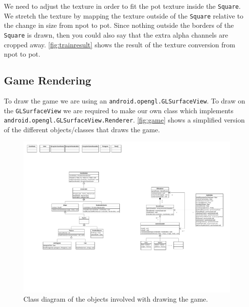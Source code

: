 We need to adjust the texture in order to fit the \ac{pot} texture inside the \lstinline|Square|. We stretch the texture by mapping the texture outside of the \lstinline|Square| relative to the change in size from \ac{npot} to \ac{pot}. Since nothing outside the borders of the \lstinline|Square| is drawn, then you could also say that the extra alpha channels are cropped away. \autoref{fig:trainresult} shows the result of the texture conversion from \ac{npot} to \ac{pot}.

\subsection{Game Rendering}\label{sec:gamerendering}

To draw the game we are using an \lstinline|android.opengl.GLSurfaceView|. To draw on the \lstinline|GLSurfaceView| we are required to make our own class which implements \lstinline|android.opengl.GLSurfaceView.Renderer|. \autoref{fig:game} shows a simplified version of the different objects/classes that draws the game.

\begin{figure}[H]
\centering
\includegraphics[page=3,width=1\linewidth]{img/opengl.pdf}
\caption{Class diagram of the objects involved with drawing the game.}
\label{fig:game}
\end{figure}

